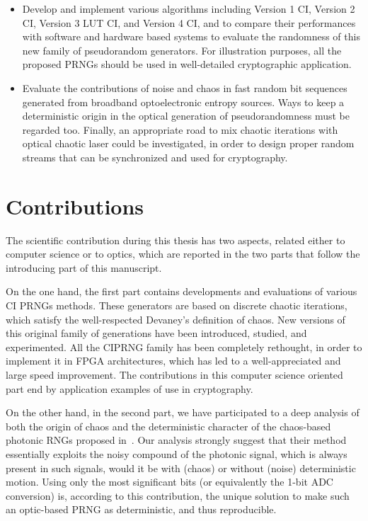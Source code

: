\begin{itemize}
\item Develop and implement various algorithms including Version 1 CI, Version 2 CI, Version 3 LUT CI, and Version 4 CI, and to compare their performances with software and hardware based systems to evaluate the randomness of this new family of pseudorandom generators. For illustration purposes, all the proposed PRNGs should be used in well-detailed cryptographic application.

\item Evaluate the contributions of noise and chaos in fast random bit sequences generated from broadband optoelectronic entropy sources. Ways to keep a deterministic origin in the optical generation 
of pseudorandomness must be regarded too. Finally, an appropriate road to mix chaotic iterations with optical chaotic laser could be investigated, in order to design proper random streams that can be synchronized and used for cryptography. 
\end{itemize}

\section{Contributions}

The scientific contribution during this thesis has two aspects, related either
to computer science or to optics, which are reported in the two parts that follow
the introducing part of this manuscript.

On the one hand, the first part contains developments and evaluations of various CI PRNGs methods. 
These generators are based on discrete chaotic iterations, which satisfy the well-respected 
Devaney's definition of chaos. New versions of this original family of generations have been 
introduced, studied, and experimented. 
All the CIPRNG family has been completely rethought, in order to implement it in FPGA architectures, 
which has led to a well-appreciated and large speed improvement. The contributions in this
computer science oriented part end by application examples of use in cryptography.

On the other hand, in the second part, we have participated to a deep analysis of 
both the origin of chaos and
the deterministic character of the chaos-based photonic RNGs proposed 
in~\cite{ultrafast2009, ultrafast2010}. Our analysis strongly suggest that
their method essentially exploits the noisy compound of the photonic signal, which
is always present in such signals, would it be with (chaos) or without (noise) 
deterministic motion. Using only the most significant bits (or equivalently the 1-bit 
ADC conversion) is, according to this contribution, the unique solution to make
such an optic-based PRNG as deterministic, and thus reproducible. 


